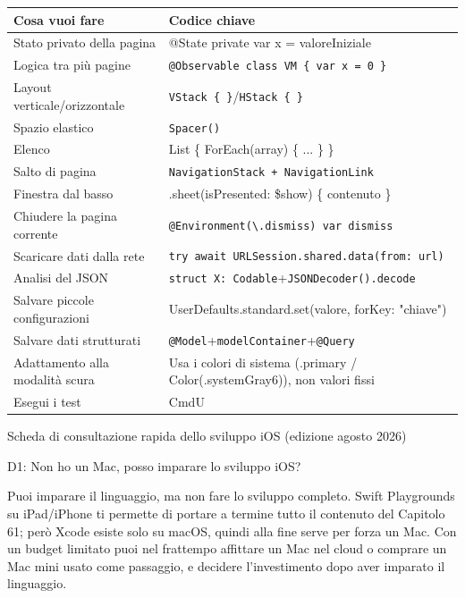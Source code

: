 


\begin{center}
\begin{tabularx}{\linewidth}{|X|X|}
\hline
\textbf{Cosa vuoi fare} & \textbf{Codice chiave} \tabularnewline
\hline
Stato privato della pagina & @State private var x = valoreIniziale \tabularnewline
Logica tra più pagine & \texttt{@Observable class VM \{ var x = 0 \}} \tabularnewline
Layout verticale/orizzontale & \texttt{VStack \{ \}}/\texttt{HStack \{ \}} \tabularnewline
Spazio elastico & \texttt{Spacer()} \tabularnewline
Elenco & List \{ ForEach(array) \{ ... \} \} \tabularnewline
Salto di pagina & \texttt{NavigationStack + NavigationLink} \tabularnewline
Finestra dal basso & .sheet(isPresented: \$show) \{ contenuto \} \tabularnewline
Chiudere la pagina corrente & \texttt{@Environment(\textbackslash{}.\allowbreak dismiss) var dismiss} \tabularnewline
Scaricare dati dalla rete & \texttt{try await URLSession.\allowbreak shared.\allowbreak data(from: url)} \tabularnewline
Analisi del JSON & \texttt{struct X: Codable}+\texttt{JSONDecoder().\allowbreak decode} \tabularnewline
Salvare piccole configurazioni & UserDefaults.standard.set(valore, forKey: "chiave") \tabularnewline
Salvare dati strutturati & \texttt{@Model}+\texttt{modelContainer}+\texttt{@Query} \tabularnewline
Adattamento alla modalità scura & Usa i colori di sistema (.primary / Color(.systemGray6)), non valori fissi \tabularnewline
Esegui i test & CmdU \tabularnewline
\hline
\end{tabularx}
\end{center}

\begin{center}\small\color{gray}Scheda di consultazione rapida dello sviluppo iOS (edizione agosto 2026)\end{center}


D1: Non ho un Mac, posso imparare lo sviluppo iOS?

Puoi imparare il linguaggio, ma non fare lo sviluppo completo. Swift Playgrounds su iPad/iPhone ti permette di portare a termine tutto il contenuto del Capitolo 61; però Xcode esiste solo su macOS, quindi alla fine serve per forza un Mac. Con un budget limitato puoi nel frattempo affittare un Mac nel cloud o comprare un Mac mini usato come passaggio, e decidere l'investimento dopo aver imparato il linguaggio.

